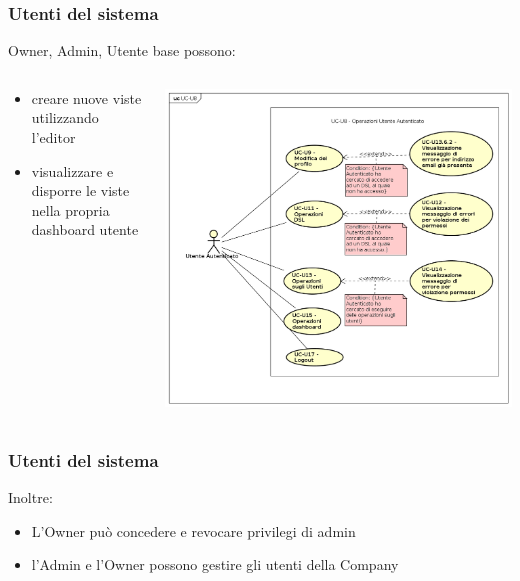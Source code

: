 \begin{frame}
  \frametitle{Utenti del sistema}
  Owner, Admin, Utente base possono:
  \begin{columns}
    \begin{column}{0.5\textwidth}
       \begin{itemize}
       \item creare nuove viste utilizzando l'editor
       \item visualizzare e disporre le viste nella propria dashboard utente
       \end{itemize}
    \end{column}
    \begin{column}{0.5\textwidth}
    \includegraphics[width=0.8\columnwidth]{res/img/UCUtenti.png}
    \end{column}
  \end{columns}
\end{frame}

\begin{frame}
  \frametitle{Utenti del sistema}
  Inoltre:
  \begin{itemize}
  \item L'Owner può concedere e revocare privilegi di admin
  \item l'Admin e l'Owner possono gestire gli utenti della Company
  \end{itemize}

\end{frame}


